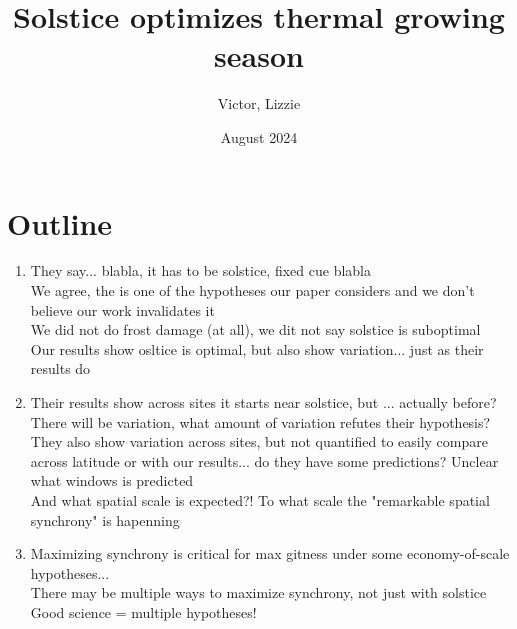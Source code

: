 \documentclass[11pt,letter]{article}
\title{Solstice optimizes thermal growing season}
\author{Victor, Lizzie}
\date{August 2024}
\begin{document}
\maketitle

\section*{Outline}

\begin{enumerate}

\item They say... blabla, it has to be solstice, fixed cue blabla\\
We agree, the is one of the hypotheses our paper considers and we don't believe our work invalidates it  \\
We did not do frost damage (at all), we dit not say solstice is suboptimal \\
Our results show osltice is optimal, but also show variation... just as their results do

\item Their results show across sites it starts near solstice, but ... actually before? \\
There will be variation, what amount of variation refutes their hypothesis? \\
They also show variation across sites, but not quantified to easily compare across latitude or with our results... do they have some predictions? Unclear what windows is predicted\\
And what spatial scale is expected?! To what scale the "remarkable spatial synchrony" is hapenning

\item Maximizing synchrony is critical for max gitness under some economy-of-scale hypotheses... \\
There may be multiple ways to maximize synchrony, not just with solstice \\
Good science = multiple hypotheses!

\end{enumerate}
\end{document}
